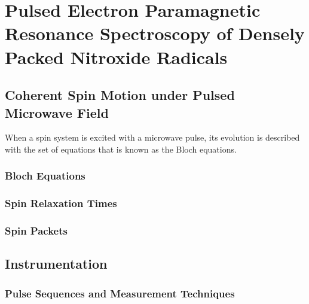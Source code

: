 \chapter{Pulsed Electron Paramagnetic Resonance Spectroscopy of Densely Packed Nitroxide Radicals}

\section{Coherent Spin Motion under Pulsed Microwave Field}
When a spin system is excited with a microwave pulse, its evolution is described with the set of equations that is known as the Bloch equations.
\subsection{Bloch Equations}
\subsection{Spin Relaxation Times}
\subsection{Spin Packets}

\section{Instrumentation}
\subsection{Pulse Sequences and Measurement Techniques}

